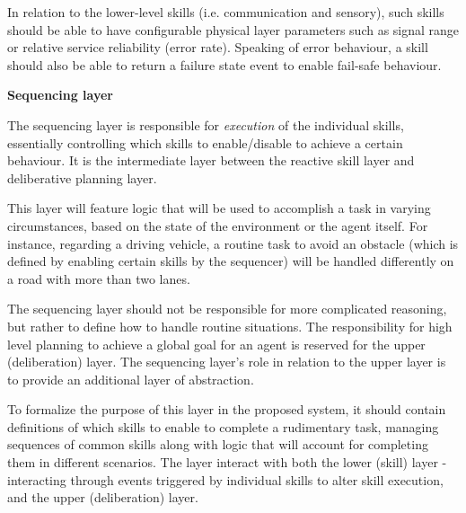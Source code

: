 \documentclass[main.tex]{subfiles}
\begin{document}
In relation to the lower-level skills (i.e. communication and sensory), such skills should be 
able to have configurable physical layer parameters such as signal range or relative service
reliability (error rate). Speaking of error behaviour, a skill should also be able to return a
failure state event to enable fail-safe behaviour. 

\textbf{Sequencing layer}

The sequencing layer is responsible for \emph{execution} of the individual skills, essentially 
controlling which skills to enable/disable to achieve a certain behaviour. It is the 
intermediate layer between the reactive skill layer and deliberative planning layer. 

This layer will feature logic that will be used to accomplish a task in varying circumstances, 
based on the state of the environment or the agent itself. For instance, regarding a driving 
vehicle, a routine task to avoid an obstacle (which is defined by enabling certain skills by
the sequencer) will be handled differently on a road with more than two lanes.

The sequencing layer should not be responsible for more complicated reasoning, but rather 
to define how to handle routine situations. The responsibility for high level planning to achieve 
a global goal for an agent is reserved for the upper (deliberation) layer. The sequencing layer's 
role in relation to the upper layer is to provide an additional layer of abstraction.

To formalize the purpose of this layer in the proposed system, it should contain definitions 
of which skills to enable to complete a rudimentary task, managing sequences of common skills
along with logic that will account for completing them in different scenarios. The layer
interact with both the lower (skill) layer - interacting through events triggered by individual
skills to alter skill execution, and the upper (deliberation) layer. 


\end{document}
